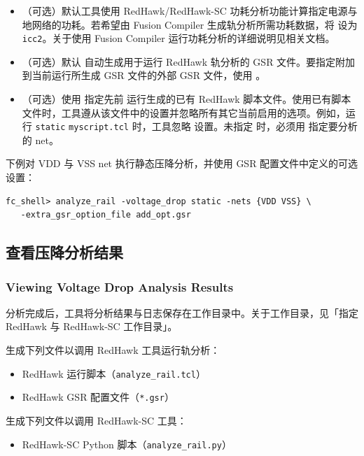 \begin{itemize}
  \item （可选）默认工具使用 RedHawk/RedHawk-SC 功耗分析功能计算指定电源与地网络的功耗。若希望由 Fusion Compiler 生成轨分析所需功耗数据，将  设为 \texttt{icc2}。关于使用 Fusion Compiler  运行功耗分析的详细说明见相关文档。
  \item （可选）默认  自动生成用于运行 RedHawk 轨分析的 GSR 文件。要指定附加到当前运行所生成 GSR 文件的外部 GSR 文件，使用 。
  \item （可选）使用  指定先前  运行生成的已有 RedHawk 脚本文件。使用已有脚本文件时，工具遵从该文件中的设置并忽略所有其它当前启用的选项。例如，运行   \texttt{static}  \texttt{myscript.tcl} 时，工具忽略  设置。未指定  时，必须用  指定要分析的 net。
\end{itemize}

下例对 VDD 与 VSS net 执行静态压降分析，并使用 GSR 配置文件中定义的可选设置：
\begin{lstlisting}
fc_shell> analyze_rail -voltage_drop static -nets {VDD VSS} \
   -extra_gsr_option_file add_opt.gsr
\end{lstlisting}

\subsection{查看压降分析结果}
\subsubsection*{Viewing Voltage Drop Analysis Results}

分析完成后，工具将分析结果与日志保存在工作目录中。关于工作目录，见「指定 RedHawk 与 RedHawk-SC 工作目录」。

 生成下列文件以调用 RedHawk 工具运行轨分析：
\begin{itemize}
  \item RedHawk 运行脚本（\texttt{analyze\_rail.tcl}）
  \item RedHawk GSR 配置文件（\texttt{*.gsr}）
\end{itemize}

 生成下列文件以调用 RedHawk-SC 工具：
\begin{itemize}
  \item RedHawk-SC Python 脚本（\texttt{analyze\_rail.py}）
\end{itemize}

